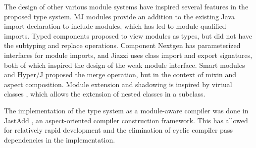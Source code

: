 The design of other various module systems have inspired several features in the 
proposed type system. MJ modules \cite{corwinMJModules} provide an addition to
the existing Java import declaration to include modules, which has led to module
qualified imports. Typed components \cite{secotypedcomponents} proposed to
view modules as types, but did not have the subtyping and replace operations.
Component Nextgen \cite{componentnextgen} has parameterized interfaces for module imports,
and Jiazzi \cite{mcdirmid01jiazzi} uses class import and export signatures, 
both of which inspired the design of the weak module interface. Smart modules
\cite{Ancona05smartmodules} and Hyper/J \cite{hyperj} proposed the merge operation, 
but in the context of mixin and aspect composition. Module extension and shadowing is inspired by 
virtual classes \cite{virtualclasses89}, which allows the extension of nested classes in a subclass.

The implementation of the type system as a module-aware compiler was done in JastAdd \cite{jastadd},
an aspect-oriented compiler construction framework. This has allowed for relatively
rapid development and the elimination of cyclic compiler pass dependencies in
the implementation.